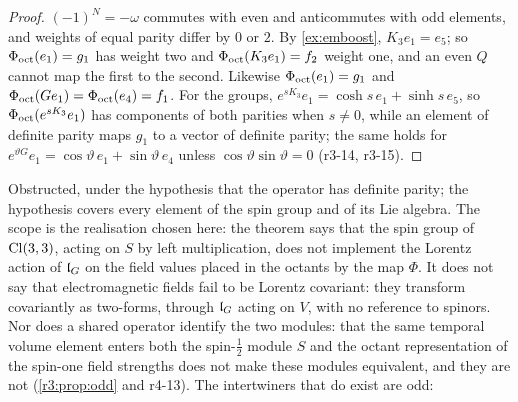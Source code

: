 \begin{proof}
$(-1)^N=-\omega$ commutes with even and anticommutes with odd elements, and weights of equal parity differ by $0$ or $2$. By \cref{ex:emboost}, $K_3e_1=e_5$; so $\Phi_{\rm oct}(e_1)=g_1$ has weight two and $\Phi_{\rm oct}(K_3e_1)=f_2$ weight one, and an even $Q$ cannot map the first to the
second. Likewise $\Phi_{\rm oct}(e_1)=g_1$ and $\Phi_{\rm oct}(Ge_1)=\Phi_{\rm oct}(e_4)=f_1$. For the groups, $e^{sK_3}e_1=\cosh s\,e_1+\sinh s\,e_5$, so $\Phi_{\rm oct}(e^{sK_3}e_1)$ has
components of both parities when $s\neq0$, while an element of definite parity maps $g_1$ to a vector of definite parity; the same holds for
$e^{\vartheta G}e_1=\cos\vartheta\,e_1+\sin\vartheta\,e_4$ unless $\cos\vartheta\sin\vartheta=0$ (r3-14, r3-15).
\end{proof}

Obstructed, under the hypothesis that the operator has definite parity; the hypothesis covers every element of the spin group and of its
Lie algebra. The scope is the realisation chosen here: the theorem says that the spin group of $\mathrm{Cl}(3,3)$, acting on $S$ by left multiplication,
does not implement the Lorentz action of $\mathfrak l_G$ on the field values placed in the octants by the map $\Phi$. It does not say that electromagnetic
fields fail to be Lorentz covariant: they transform covariantly as two-forms, through $\mathfrak l_G$ acting on $V$, with no reference to spinors. Nor does a
shared operator identify the two modules: that the same temporal volume element enters both the spin-$\tfrac12$ module $S$ and the octant
representation of the spin-one field strengths does not make these modules equivalent, and they are not (\cref{r3:prop:odd} and r4-13).
The intertwiners that do exist are odd:

